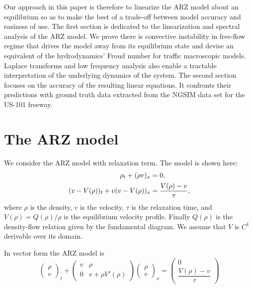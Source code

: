 \documentclass[a4paper, 10pt, conference]{ieeeconf}      %
\begin{document}
Our approach in this paper is therefore to linearize the ARZ model about an equilibrium so as to make the best of a trade-off between model accuracy and easiness of use. The first section is dedicated to the linearization and spectral analysis of the ARZ model. We prove there is convective instability in free-flow regime that drives the model away from its equilibrium  state and devise an equivalent of the hydrodynamics' Froud number for traffic macroscopic models. Laplace transforms and low frequency analysis also enable a tractable interpretation of the underlying dynamics of the system. The second section focuses on the accuracy of the resulting linear equations. It confronts their predictions with ground truth data extracted from the NGSIM data set for the US-101 freeway.

\section{The ARZ model} \label{ARZSection}

We consider the ARZ model with relaxation term. The model is shown here:
{\footnotesize
\begin{align} 
\footnotesize
\rho_t + (\rho v)_x &= 0, \label{ARZ1} \\
(v - V(\rho))_t + v(v - V(\rho))_x &=\dfrac{V(\rho) - v}{\tau} \label{ARZ2},
\end{align}
}
where $\rho$ is the density, $v$ is the velocity, $\tau$ is the relaxation time, and $V(\rho) = Q(\rho)/\rho$ is the equilibrium velocity profile. Finally $Q(\rho)$ is the density-flow relation given by the fundamental diagram. We assume that $V$ is $C^{1}$ derivable over its domain.

In vector form the ARZ model is
{\footnotesize
\begin{equation} \label{ARZrhov}
\begin{pmatrix}
	\rho \\
	v
\end{pmatrix}_t
+ 
\begin{pmatrix}
	v & \rho \\
	0 & v + \rho V' (\rho)
\end{pmatrix}
\begin{pmatrix}
	\rho \\ 
	v
\end{pmatrix}_x = 
\begin{pmatrix}
	0 \\ 
	\dfrac{V(\rho) - v}{\tau}
\end{pmatrix}
\end{equation}
}
\end{document}
